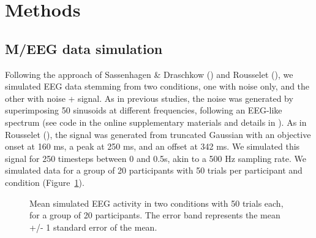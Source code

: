 \documentclass[
  doc,
  floatsintext,
  longtable,
  a4paper,
  nolmodern,
  notxfonts,
  notimes,
  colorlinks=true,linkcolor=blue,citecolor=blue,urlcolor=blue]{apa7}
\begin{document}
\section{Methods}\label{methods}

\subsection{M/EEG data simulation}\label{meeg-data-simulation}

Following the approach of Sassenhagen \& Draschkow
() and Rousselet
(), we simulated EEG data
stemming from two conditions, one with noise only, and the other with
noise + signal. As in previous studies, the noise was generated by
superimposing 50 sinusoids at different frequencies, following an
EEG-like spectrum (see code in the online supplementary materials and
details in ). As in
Rousselet (), the signal was
generated from truncated Gaussian with an objective onset at 160 ms, a
peak at 250 ms, and an offset at 342 ms. We simulated this signal for
250 timesteps between 0 and 0.5s, akin to a 500 Hz sampling rate. We
simulated data for a group of 20 participants with 50 trials per
participant and condition (Figure~\ref{fig-eeg}).

\begin{figure}[!htb]

\caption{\label{fig-eeg}Mean simulated EEG activity in two conditions
with 50 trials each, for a group of 20 participants. The error band
represents the mean +/- 1 standard error of the mean.}


\end{figure}%
\end{document}
